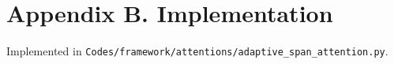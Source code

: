 \section*{Appendix B. Implementation}Implemented in \texttt{Codes/framework/attentions/adaptive\_span\_attention.py}.
